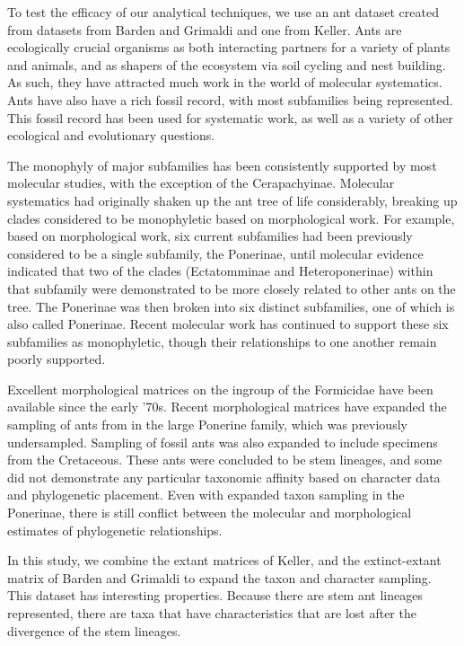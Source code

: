 \documentclass[]{article}
\begin{document}
To test the efficacy of our analytical techniques, we use an ant dataset created from datasets from Barden and Grimaldi and one from Keller.
Ants are ecologically crucial organisms as both interacting partners for a variety of plants and animals, and as shapers of the ecosystem via soil cycling and nest building.
As such, they have attracted much work in the world of molecular systematics.
Ants have also have a rich fossil record, with most subfamilies being represented. 
This fossil record has been used for systematic work, as well as a variety of other ecological and evolutionary questions.\par
The monophyly of major subfamilies has been consistently supported by most molecular studies, with the exception of the Cerapachyinae. 
Molecular systematics had originally shaken up the ant tree of life considerably, breaking up clades considered to be monophyletic based on morphological work.
For example, based on morphological work, six current subfamilies had been previously considered to be a single subfamily, the Ponerinae, until molecular evidence indicated that two of the clades (Ectatomminae and Heteroponerinae) within that subfamily were demonstrated to be more closely related to other ants on the tree.
The Ponerinae was then broken into six distinct subfamilies, one of which is also called Ponerinae. 
Recent molecular work has continued to support these six subfamilies as monophyletic, though their relationships to one another remain poorly supported. \par
Excellent morphological matrices on the ingroup of the Formicidae have been available since the early '70s. 
Recent morphological matrices have expanded the sampling of ants from in the large Ponerine family, which was previously undersampled.
Sampling of fossil ants was also expanded to include specimens from the Cretaceous.
These ants were concluded to be stem lineages, and some did not demonstrate any particular taxonomic affinity based on character data and phylogenetic placement. 
Even with expanded taxon sampling in the Ponerinae, there is still conflict between the molecular and morphological estimates of phylogenetic relationships. \par
In this study, we combine the extant matrices of Keller, and the extinct-extant matrix of Barden and Grimaldi to expand the taxon and character sampling.  
This dataset has interesting properties.
Because there are stem ant lineages represented, there are taxa that have characteristics that are lost after the divergence of the stem lineages.
\end{document}
